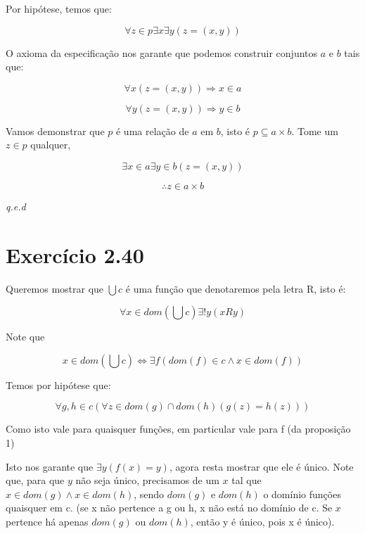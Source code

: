 \documentclass[12pt]{extarticle}
\newcommand{\fim}{\begin{flushright}

   \emph{q.e.d}
\end{flushright}}
\begin{document}
Por hipótese, temos que:

$$\forall z \in p \exists x \exists y (z = (x,y))$$

O axioma da especificação nos garante que podemos construir conjuntos $a$ e $b$ tais que:

\begin{equation}
    \forall x (z = (x,y)) \Rightarrow x \in a
\end{equation}

\begin{equation}
 \forall y (z = (x,y)) \Rightarrow y \in b
\end{equation}

Vamos demonstrar que $p$ é uma relação de $a$ em $b$, isto é $p \subseteq a \times b$. Tome um $z \in p$ qualquer,

$$
\exists x \in a \exists y \in b (z = (x,y))
$$

$$
\therefore z \in a \times b
$$

\fim

\section{Exercício 2.40}

Queremos mostrar que $\bigcup c$ é uma função que denotaremos pela letra R, isto é:

$$\forall x \in dom (\bigcup c) \exists! y (xRy) $$

Note que

\begin{equation}
    x \in dom (\bigcup c) \Leftrightarrow \exists f (dom (f) \in c \land x \in dom (f))
\end{equation}

Temos por hipótese que:

\begin{equation}
   \forall g,h \in c (\forall z \in dom(g) \cap dom(h) (g(z) = h(z))) 
\end{equation}

Como isto vale para quaisquer funções, em particular vale para f (da proposição 1)

Isto nos garante que $\exists y (f(x) = y)$, agora resta mostrar que ele é único. Note que, para que $y$ não seja único, precisamos de um $x$ tal que $x \in dom(g) \land x \in dom(h)$, sendo $dom(g)$ e $dom(h)$ o domínio funções quaisquer em c.  (se x não pertence a g ou h, x não está no domínio de c. Se $x$ pertence há apenas $dom(g)$ ou $dom(h)$, então y é único, pois x é único).
\end{document}
